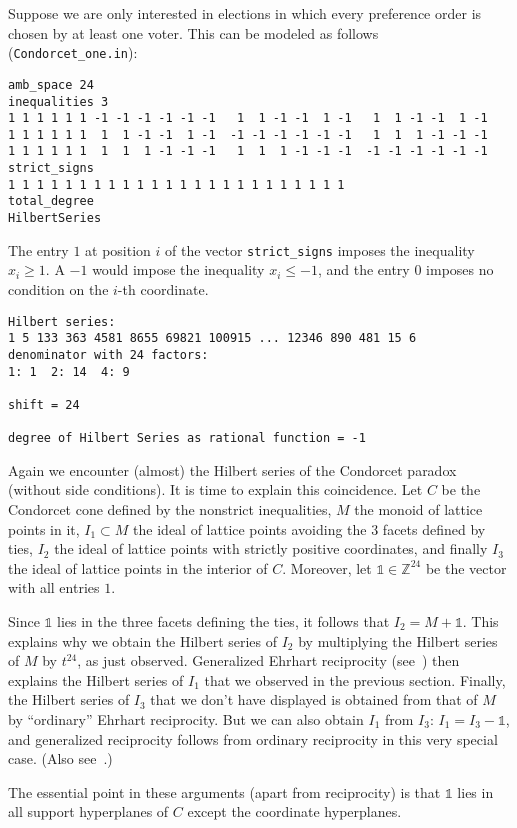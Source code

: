 \documentclass[12pt,a4paper]{scrartcl}
\theoremstyle{definition}
\def\ZZ{{\mathbb Z}}
\begin{document}
Suppose we are only interested in elections in which every preference order is chosen by at least one voter. This can be modeled as follows (\verb|Condorcet_one.in|):
\begin{Verbatim}
amb_space 24
inequalities 3
1 1 1 1 1 1 -1 -1 -1 -1 -1 -1   1  1 -1 -1  1 -1   1  1 -1 -1  1 -1
1 1 1 1 1 1  1  1 -1 -1  1 -1  -1 -1 -1 -1 -1 -1   1  1  1 -1 -1 -1
1 1 1 1 1 1  1  1  1 -1 -1 -1   1  1  1 -1 -1 -1  -1 -1 -1 -1 -1 -1
strict_signs
1 1 1 1 1 1 1 1 1 1 1 1 1 1 1 1 1 1 1 1 1 1 1 1
total_degree
HilbertSeries
\end{Verbatim}
The entry $1$ at position $i$ of the vector \verb|strict_signs| imposes the inequality $x_i\ge1$. A $-1$ would impose the inequality $x_i\le -1$, and the entry $0$ imposes no condition on the $i$-th coordinate.

\begin{Verbatim}
Hilbert series:
1 5 133 363 4581 8655 69821 100915 ... 12346 890 481 15 6 
denominator with 24 factors:
1: 1  2: 14  4: 9  

shift = 24

degree of Hilbert Series as rational function = -1
\end{Verbatim}
Again we encounter (almost) the Hilbert series of the Condorcet paradox (without side conditions). It is time to explain this coincidence. Let $C$ be the Condorcet cone defined by the nonstrict inequalities, $M$ the monoid of lattice points in it, $I_1\subset M$ the ideal of lattice points avoiding the $3$ facets defined by ties, $I_2$ the ideal of lattice points with strictly positive coordinates, and finally $I_3$ the ideal of lattice points in the interior of $C$. Moreover, let $\mathds{1}\in\ZZ^{24}$ be the vector with all entries $1$.

Since $\mathds{1}$ lies in the three facets defining the ties, it follows that $I_2=M+\mathds{1}$. This explains why we obtain the Hilbert series of $I_2$ by multiplying the Hilbert series of $M$ by $t^{24}$, as just observed. Generalized Ehrhart reciprocity (see~\cite[Theorem~6.70]{BG}) then explains the Hilbert series of $I_1$ that we observed in the previous section. Finally, the Hilbert series of $I_3$ that we don't have displayed is obtained from that of $M$ by ``ordinary'' Ehrhart reciprocity. But we can also obtain $I_1$ from $I_3$: $I_1=I_3-\mathds{1}$, and generalized reciprocity follows from ordinary reciprocity in this very special case. (Also see~\cite{BIS2}.)

The essential point in these arguments (apart from reciprocity) is that $\mathds{1}$ lies in all support hyperplanes of $C$ except the coordinate hyperplanes.
\end{document}

